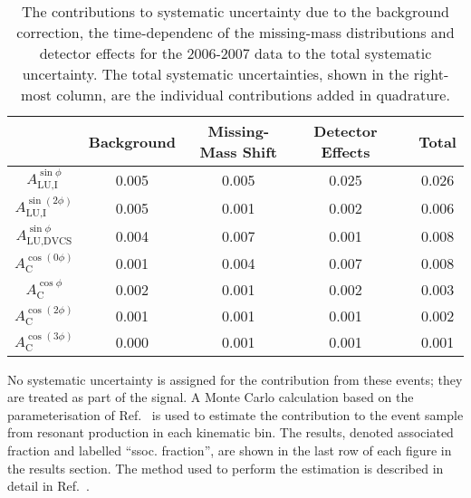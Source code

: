 \begin{table}[H]
 \begin{center}
\resizebox{16cm}{!} {
 \begin{tabular}{|c|c|c|c|c|c|}
  \hline
 & Background & Missing-Mass Shift & Detector Effects & & Total \\
  \hline
  \hline
  $A_{\textrm{LU,I}}^{\sin\phi}$ & 0.005 & 0.005 & 0.025 & & 0.026 \\
  \hline
  $A_{\textrm{LU,I}}^{\sin(2\phi)}$ & 0.005 & 0.001 & 0.002 & & 0.006 \\
  \hline
  \hline
  $A_{\textrm{LU,DVCS}}^{\sin\phi}$  & 0.004 & 0.007 & 0.001 & & 0.008 \\
  \hline
  \hline
  $A_{\textrm{C}}^{\cos(0\phi)}$ & 0.001 & 0.004 & 0.007 & & 0.008 \\
  \hline
  $A_{\textrm{C}}^{\cos\phi}$ & 0.002 & 0.001 & 0.002 & & 0.003 \\
  \hline
  $A_{\textrm{C}}^{\cos(2\phi)}$ & 0.001 & 0.001 & 0.001 & & 0.002 \\
  \hline
  $A_{\textrm{C}}^{\cos(3\phi)}$ & 0.000 & 0.001 & 0.001 & & 0.001 \\
  \hline
 \end{tabular}
}
  \caption{The contributions to  systematic uncertainty due to the
background correction, the time-dependenc of the missing-mass
distributions and detector effects for the 2006-2007 data to the total
systematic uncertainty. The total systematic uncertainties, shown in the
right-most column, are the individual contributions added in quadrature.}
  \label{table_systematic_contributions_0607}
\end{center}
\end{table}

No systematic uncertainty is assigned for the contribution from these events; they are treated as part of the signal. A Monte Carlo calculation based on the parameterisation of Ref.~\cite{Bra76} is used to estimate the contribution to the event sample from resonant production in each kinematic bin. The results, denoted associated fraction and labelled ``ssoc. fraction'', are shown in the last row of each figure in the results section. The method used to perform the estimation is described in detail in
Ref.~\cite{Air08}.

